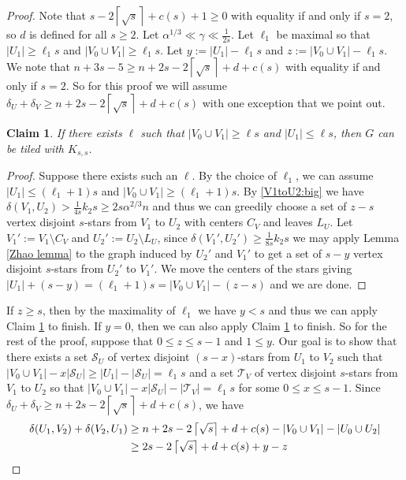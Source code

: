 \documentclass[oneside,12pt]{memoir}
\newtheorem{claim}[theorem]{Claim}
\newcommand{\croot}[1]{\left\lceil\sqrt{#1}\right\rceil}
\begin{document}
\begin{proof}
Note that $s-2\croot{s}+c(s)+1\geq 0$ with equality if and only if $s=2$, so $d$ is defined for all $s\geq 2$.  Let $\alpha^{1/3}\ll \gamma\ll \frac{1}{2s}$.  Let $\ell_1$ be maximal so that $|U_1|\geq \ell_1 s$ and $|V_0\cup V_1|\geq \ell_1 s$.  Let $y:=|U_1|-\ell_1 s$ and $z:=|V_0\cup V_1|-\ell_1 s$.  We note that $n+3s-5\geq n+2s-2\croot{s}+d+c(s)$ with equality if and only if $s=2$.  So for this proof we will assume $\delta_U+\delta_V\geq n+2s-2\croot{s}+d+c(s)$ with one exception that we point out.

\begin{claim}\label{V1>U1}
If there exists $\ell$ such that $|V_0\cup V_1|\geq \ell s$ and $|U_1|\leq \ell s$, then $G$ can be tiled with $K_{s,s}$.  
\end{claim}

\begin{proof}
Suppose there exists such an $\ell$.  By the choice of $\ell_1$, we can assume $|U_1|\leq (\ell_1+1)s$ and $|V_0\cup V_1|\geq (\ell_1+1)s$. By \eqref{V1toU2:big} we have $\delta(V_1,U_2)>\frac{1}{4s}k_2s\geq 2s\alpha^{2/3}n$ and thus we can greedily choose a set of $z-s$ vertex disjoint $s$-stars from $V_1$ to $U_2$ with centers $C_V$ and leaves $L_U$.  Let $V_1':=V_1\setminus C_V$ and $U_2':=U_2\setminus L_U$, since $\delta(V_1',U_2')\geq \frac{1}{8s} k_2s$ we may apply Lemma \ref{Zhao lemma} to the graph induced by $U_2'$ and $V_1'$ to get a set of $s-y$ vertex disjoint $s$-stars from $U_2'$ to $V_1'$.  We move the centers of the stars giving $|U_1|+(s-y)=(\ell_1+1)s=|V_0\cup V_1|-(z-s)$ and we are done.
\end{proof}

If $z\geq s$, then by the maximality of $\ell_1$ we have $y<s$ and thus we can apply Claim \ref{V1>U1} to finish.  If $y=0$, then we can also apply Claim \ref{V1>U1} to finish.  So for the rest of the proof, suppose that $0\leq z\leq s-1$ and $1\leq y$.  Our goal is to show that there exists a set $\mathcal{S}_U$ of vertex disjoint $(s-x)$-stars from $U_1$ to $V_2$ such that $|V_0\cup V_1|-x|\mathcal{S}_U|\geq |U_1|-|\mathcal{S}_U|=\ell_1 s$ and a set $\mathcal{T}_V$ of vertex disjoint $s$-stars from $V_1$ to $U_2$ so that $|V_0\cup V_1|-x|\mathcal{S}_U|-|\mathcal{T}_V|=\ell_1 s$ for some $0\leq x\leq s-1$.
Since $\delta_U+\delta_V\geq n+2s-2\croot{s}+d+c(s)$, we have 
\begin{align}
\delta(U_1,V_2)+\delta(V_2,U_1)&\geq n+2s-2\croot{s}+d+c(s)-|V_0\cup V_1|-|U_0\cup U_2|\notag\\
&\geq 2s-2\croot{s}+d+c(s)+y-z\label{diagonal}
\end{align}


\end{proof}
\end{document}
